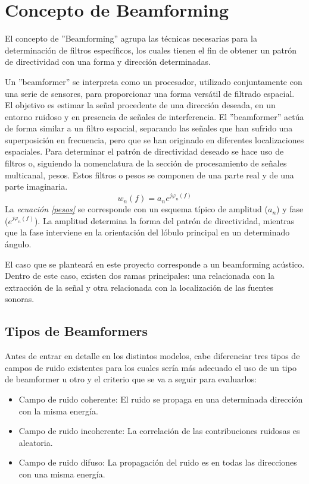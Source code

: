 \documentclass[a4paper,11pt]{book}
\begin{document}
	\section{Concepto de Beamforming}
	El concepto de ''Beamforming'' agrupa las técnicas necesarias para la determinación de filtros específicos, los cuales tienen el fin de obtener un patrón de directividad con una forma y dirección determinadas.
	
	Un ''beamformer'' se interpreta como un procesador, utilizado conjuntamente con una serie de sensores, para proporcionar una forma versátil de filtrado espacial. El objetivo es estimar la señal procedente de una dirección deseada, en un entorno ruidoso y en presencia de señales de interferencia. El ''beamformer'' actúa de forma similar a un filtro espacial, separando las señales que han sufrido una superposición en frecuencia, pero que se han originado en diferentes localizaciones espaciales. Para determinar el patrón de directividad deseado se hace uso de filtros o, siguiendo la nomenclatura de la sección de procesamiento de señales multicanal, pesos. Estos filtros o pesos se componen de una parte real y de una parte imaginaria.
	\begin{equation}
	w_{n}(f) = a_{n} e^{j\varphi_{n}(f)}
	\label{pesos}
	\end{equation}
	La \textit{ecuación \ref{pesos}} se corresponde con un esquema típico de amplitud ($a_{n}$) y fase ($e^{j\varphi_{n}(f)}$). La amplitud determina la forma del patrón de directividad, mientras que la fase interviene en la orientación del lóbulo principal en un determinado ángulo.
	
	El caso que se planteará en este proyecto corresponde a un beamforming acústico. Dentro de este caso, existen dos ramas principales: una relacionada con la extracción de la señal y otra relacionada con la localización de las fuentes sonoras.
	
		\subsection{Tipos de Beamformers}
		
		Antes de entrar en detalle en los distintos modelos, cabe diferenciar tres tipos de campos de ruido existentes para los cuales sería más adecuado el uso de un tipo de beamformer u otro y el criterio que se va a seguir para evaluarlos:
		\begin{itemize}
		\item Campo de ruido coherente: El ruido se propaga en una determinada dirección con la misma energía.
		\item Campo de ruido incoherente: La correlación de las contribuciones ruidosas es aleatoria.
		\item Campo de ruido difuso: La propagación del ruido es en todas las direcciones con una misma energía.
		\end{itemize}
		
\end{document}
